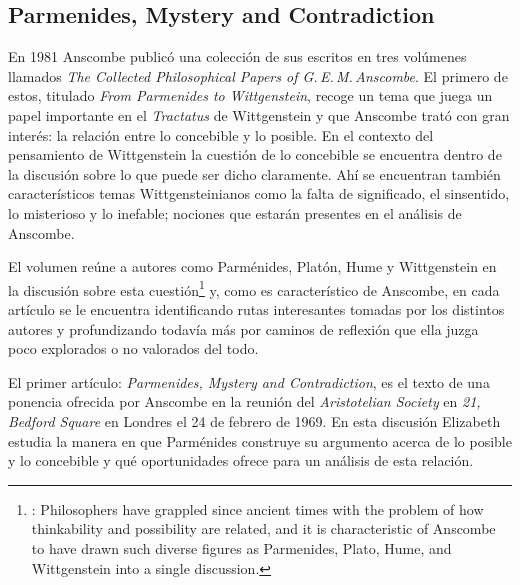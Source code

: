 \subsection{Parmenides, Mystery and Contradiction}

En 1981 Anscombe publicó una colección de sus escritos en tres volúmenes llamados \emph{The Collected Philosophical Papers of G.\,E.\,M.\,Anscombe}. El primero de estos, titulado \emph{From Parmenides to Wittgenstein}, recoge un tema que juega un papel importante en el \emph{Tractatus} de Wittgenstein y que Anscombe trató con gran interés: la relación entre lo concebible y lo posible. En el contexto del pensamiento de Wittgenstein la cuestión de lo concebible se encuentra dentro de la discusión sobre lo que puede ser dicho claramente. Ahí se encuentran también característicos temas Wittgensteinianos como la falta de significado, el sinsentido, lo misterioso y lo inefable; nociones que estarán presentes en el análisis de Anscombe.

  El volumen reúne a autores como Parménides, Platón, Hume y Wittgenstein en la discusión sobre esta cuestión\footnote{\cite[Cf.~][193]{teichmann2008ans}: Philosophers have grappled since ancient times with the problem of how thinkability and possibility are related, and it is characteristic of Anscombe to have drawn such diverse figures as Parmenides, Plato, Hume, and Wittgenstein into a single discussion.} y, como es característico de Anscombe, en cada artículo se le encuentra identificando rutas interesantes tomadas por los distintos autores y profundizando todavía más por caminos de reflexión que ella juzga poco explorados o no valorados del todo.

  El primer artículo: \emph{Parmenides, Mystery and Contradiction}, es el texto de una ponencia ofrecida por Anscombe en la reunión del \emph{Aristotelian Society} en \emph{21, Bedford Square} en Londres el 24 de febrero de 1969. En esta discusión Elizabeth estudia la manera en que Parménides construye su argumento acerca de lo posible y lo concebible y qué oportunidades ofrece para un análisis de esta relación.

